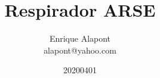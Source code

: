 \documentclass[two column, oneside]{article}
\title{Respirador ARSE} %
\author{Enrique Alapont\\alapont@yahoo.com}
\date{20200401}
\begin{document}
 
    \maketitle
    
    
    
    
    
    
    
    
    \clearpage
    \listoffigures
    
    
    
    \onecolumn
    \appendix
    \appendixpage
    
    
\end{document}

